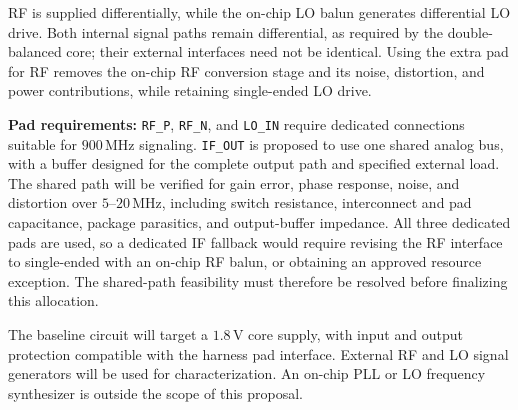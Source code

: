 RF is supplied differentially, while the on-chip LO balun generates differential LO drive.
Both internal signal paths remain differential, as required by the double-balanced core; their external interfaces need not be identical.
Using the extra pad for RF removes the on-chip RF conversion stage and its noise, distortion, and power contributions, while retaining single-ended LO drive.

\textbf{Pad requirements:}
\texttt{RF\_P}, \texttt{RF\_N}, and \texttt{LO\_IN} require dedicated connections suitable for \(900\,\mathrm{MHz}\) signaling.
\texttt{IF\_OUT} is proposed to use one shared analog bus, with a buffer designed for the complete output path and specified external load.
The shared path will be verified for gain error, phase response, noise, and distortion over \(5\)--\(20\,\mathrm{MHz}\), including switch resistance, interconnect and pad capacitance, package parasitics, and output-buffer impedance.
All three dedicated pads are used, so a dedicated IF fallback would require revising the RF interface to single-ended with an on-chip RF balun, or obtaining an approved resource exception.
The shared-path feasibility must therefore be resolved before finalizing this allocation.

The baseline circuit will target a \(1.8\,\mathrm{V}\) core supply, with input and output protection compatible with the harness pad interface.
External RF and LO signal generators will be used for characterization.
An on-chip PLL or LO frequency synthesizer is outside the scope of this proposal.
